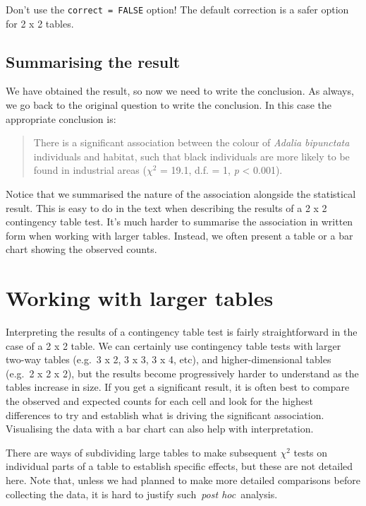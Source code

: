 \documentclass[
]{book}
\begin{document}
Don't use the \texttt{correct\ =\ FALSE} option! The default correction is a safer option for 2 x 2 tables.

\hypertarget{summarising-the-result-3}{%
\subsection{Summarising the result}\label{summarising-the-result-3}}

We have obtained the result, so now we need to write the conclusion. As always, we go back to the original question to write the conclusion. In this case the appropriate conclusion is:

\begin{quote}
There is a significant association between the colour of \emph{Adalia bipunctata} individuals and habitat, such that black individuals are more likely to be found in industrial areas (\(\chi^{2}\) = 19.1, d.f. = 1, \emph{p} \textless{} 0.001).
\end{quote}

Notice that we summarised the nature of the association alongside the statistical result. This is easy to do in the text when describing the results of a 2 x 2 contingency table test. It's much harder to summarise the association in written form when working with larger tables. Instead, we often present a table or a bar chart showing the observed counts.

\hypertarget{working-with-larger-tables}{%
\section{Working with larger tables}\label{working-with-larger-tables}}

Interpreting the results of a contingency table test is fairly straightforward in the case of a 2 x 2 table. We can certainly use contingency table tests with larger two-way tables (e.g.~3 x 2, 3 x 3, 3 x 4, etc), and higher-dimensional tables (e.g.~2 x 2 x 2), but the results become progressively harder to understand as the tables increase in size. If you get a significant result, it is often best to compare the observed and expected counts for each cell and look for the highest differences to try and establish what is driving the significant association. Visualising the data with a bar chart can also help with interpretation.

There are ways of subdividing large tables to make subsequent \(\chi^{2}\) tests on individual parts of a table to establish specific effects, but these are not detailed here. Note that, unless we had planned to make more detailed comparisons before collecting the data, it is hard to justify such~\emph{post hoc}~analysis.
\end{document}
